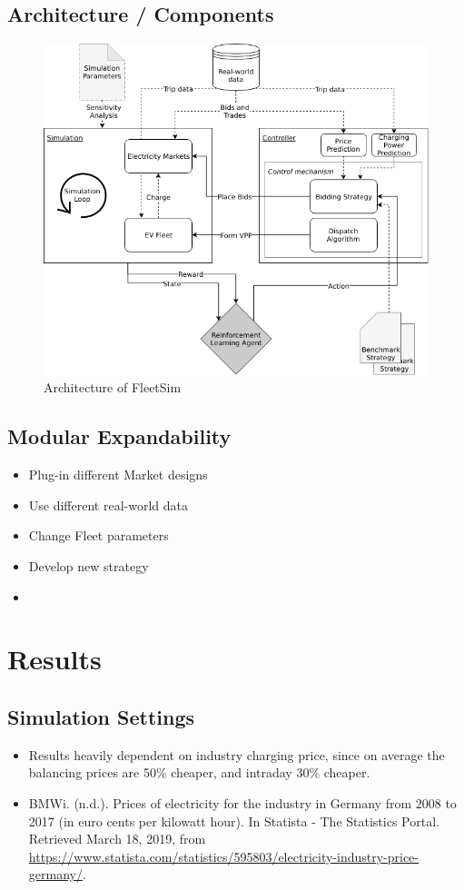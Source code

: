 \documentclass[a4paper, 12pt]{article}
\begin{document}
\subsection{Architecture / Components}
\label{sec:orgecf31ba}
\begin{figure}[htbp]
\centering
\includegraphics[width=1\linewidth]{./fig/simulation_platform.png}
\caption[FleetSim Architecture]{Architecture of FleetSim \label{fig-fleetsim}}
\end{figure}

\subsection{Modular Expandability}
\label{sec:org0bbc58e}
\begin{itemize}
\item Plug-in different Market designs
\item Use different real-world data
\item Change Fleet parameters
\item Develop new strategy
\item
\end{itemize}
\section{Results}
\label{sec:orge040338}
\subsection{Simulation Settings}
\label{sec:orgcd39f7d}
\begin{itemize}
\item Results heavily dependent on industry charging price, since on average the
balancing prices are 50\% cheaper, and intraday 30\% cheaper.
\item BMWi. (n.d.). Prices of electricity for the industry in Germany from 2008 to
2017 (in euro cents per kilowatt hour). In Statista - The Statistics Portal.
Retrieved March 18, 2019, from
\url{https://www.statista.com/statistics/595803/electricity-industry-price-germany/}.
\end{itemize}
\end{document}
